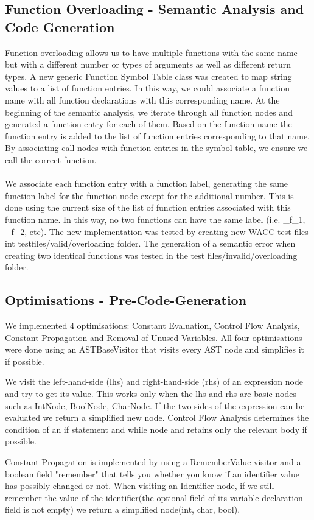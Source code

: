 \documentclass[5pt]{article}
\begin{document}
\subsection{Function Overloading - Semantic Analysis and Code Generation}
Function overloading allows us to have multiple functions with the same name but with a different number or types of arguments as well as different return types.
A new generic Function Symbol Table class was created to map string values to a list of function entries. In this way, we could associate a function name with all function declarations with this corresponding name.
At the beginning of the semantic analysis, we iterate through all function nodes and generated a function entry for each of them. Based on the function name the function entry is added to the list of function entries corresponding to that name. By associating call nodes with function entries in the symbol table, we ensure we call the correct function.
\\ \\
We associate each function entry with a function label, generating the same function label for the function node except for the additional number. This is done using the current size of the list of function entries associated with this function name. In this way, no two functions can have the same label (i.e. \_f\_1, \_f\_2, etc).
The new implementation was tested by creating new WACC test files int testfiles/valid/overloading folder. The generation of a semantic error when creating two identical functions was tested in the test files/invalid/overloading folder.
\subsection{Optimisations - Pre-Code-Generation}
We implemented 4 optimisations: Constant Evaluation, Control Flow Analysis, Constant Propagation and Removal of Unused Variables.
All four optimisations were done using an ASTBaseVisitor that visits every AST node and simplifies it if possible.

We visit the left-hand-side (lhs) and right-hand-side (rhs) of an expression node and try to get its value. This works only when the lhs and rhs are basic nodes such as IntNode, BoolNode, CharNode. If the two sides of the expression can be evaluated we return a simplified new node.
Control Flow Analysis determines the condition of an if statement and while node and retains only the relevant body if possible.

Constant Propagation is implemented by using a RememberValue visitor and a boolean field "remember" that tells you whether you know if an identifier value has possibly changed or not. When visiting an Identifier node, if we still remember the value of the identifier(the optional field of its variable declaration field is not empty) we return a simplified node(int, char, bool).
\end{document}
